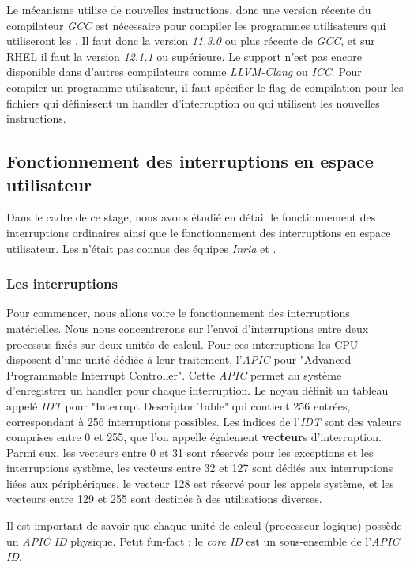 Le mécanisme utilise de nouvelles instructions, donc une version récente du compilateur \emph{GCC} est nécessaire pour compiler les programmes utilisateurs qui utiliseront les \uintr{}.
Il faut donc la version \emph{11.3.0} ou plus récente de \emph{GCC}, et sur RHEL il faut la version \emph{12.1.1} ou supérieure.
Le support n'est pas encore disponible dans d'autres compilateurs comme \emph{LLVM-Clang} ou \emph{ICC}.
Pour compiler un programme utilisateur, il faut spécifier le flag de compilation  pour les fichiers qui définissent un handler d'interruption ou qui utilisent les nouvelles instructions.

\subsection{Fonctionnement des interruptions en espace utilisateur}
\label{sec:uintr}

Dans le cadre de ce stage, nous avons étudié en détail le fonctionnement des interruptions ordinaires ainsi que le fonctionnement des interruptions en espace utilisateur.
Les \uintr{} n'était pas connus des équipes \emph{Inria} et \atos{}.

\subsubsection{Les interruptions}
\label{sec:interrupts}


Pour commencer, nous allons voire le fonctionnement des interruptions matérielles.
Nous nous concentrerons sur l'envoi d'interruptions entre deux processus fixés sur deux unités de calcul.
Pour ces interruptions les CPU disposent d'une unité dédiée à leur traitement, l'\emph{APIC} pour "Advanced Programmable Interrupt Controller".
Cette \emph{APIC} permet au système d'enregistrer un handler pour chaque interruption.
Le noyau définit un tableau appelé \emph{IDT} pour "Interrupt Descriptor Table" qui contient 256 entrées, correspondant à 256 interruptions possibles.
Les indices de l'\emph{IDT} sont des valeurs comprises entre 0 et 255, que l'on appelle également \textbf{vecteur}s d'interruption.
Parmi eux, les vecteurs entre 0 et 31 sont réservés pour les exceptions et les interruptions système,
les vecteurs entre 32 et 127 sont dédiés aux interruptions liées aux périphériques,
le vecteur 128 est réservé pour les appels système,
et les vecteurs entre 129 et 255 sont destinés à des utilisations diverses.

Il est important de savoir que chaque unité de calcul (processeur logique) possède un \emph{APIC ID} physique.
Petit fun-fact : le \emph{core ID} est un sous-ensemble de l'\emph{APIC ID}.

